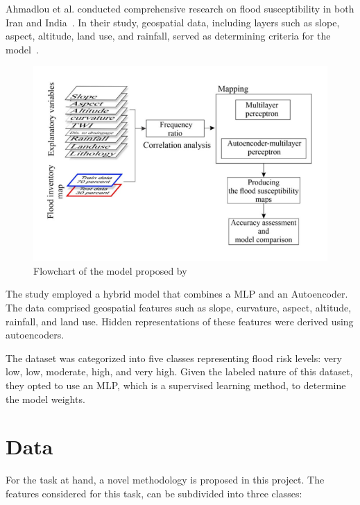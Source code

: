 \documentclass[a4paper,12pt]{Classes/RoboticsLaTeX}
\begin{document}
	Ahmadlou et al. conducted comprehensive research on flood susceptibility in both Iran and India~\cite{ahmadlou2020}. In their study, geospatial data, including layers such as 
	slope, aspect, altitude, land use, and rainfall, served as determining criteria for the model~\cite{ahmadlou2020}.

	\begin{figure}[H]
		\centering
		\includegraphics[width=1\textwidth]{Figures/AutoEncoder.png} %
		\caption{Flowchart of the model proposed by\cite{ahmadlou2020}}
		\label{fig:my_label8} %
	\end{figure}

	The study employed a hybrid model that combines a \ac{MLP} and an Autoencoder. 
	The data comprised geospatial features such as slope, curvature, aspect, altitude, rainfall, and 
	land use. Hidden representations of these features were derived using autoencoders.

	The dataset was categorized into five classes representing flood risk levels: very low, low, moderate, high, and very high. Given the labeled nature of this dataset, 
	they opted to use an MLP, which is a supervised learning method, to determine the model weights.


	\chapter{Data}
	\label{chap:methodology}

	For the task at hand, a novel methodology is proposed in this project. The features considered for this task, 
	can be subdivided into three classes:
\end{document}
